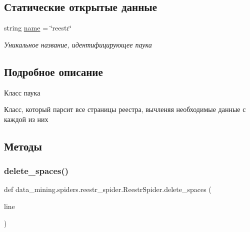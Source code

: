\subsection*{Статические открытые данные}
\begin{DoxyCompactItemize}
\item 
\mbox{\label{classdata__mining_1_1spiders_1_1reestr__spider_1_1ReestrSpider_aac1a411bc811a06b8bb5233c0448562d}} 
string \hyperlink{classdata__mining_1_1spiders_1_1reestr__spider_1_1ReestrSpider_aac1a411bc811a06b8bb5233c0448562d}{name} = \char`\"{}reestr\char`\"{}
\begin{DoxyCompactList}\small\item\em Уникальное название, идентифицирующее паука \end{DoxyCompactList}\end{DoxyCompactItemize}


\subsection{Подробное описание}
Класс паука 

Класс, который парсит все страницы реестра, вычленяя необходимые данные с каждой из них 

\subsection{Методы}
\mbox{\label{classdata__mining_1_1spiders_1_1reestr__spider_1_1ReestrSpider_aa3210a5e3ec964c5a1bbc301f72d101c}} 
\subsubsection{\texorpdfstring{delete\+\_\+spaces()}{delete\_spaces()}}
{\footnotesize\ttfamily def data\+\_\+mining.\+spiders.\+reestr\+\_\+spider.\+Reestr\+Spider.\+delete\+\_\+spaces (\begin{DoxyParamCaption}\item[{}]{line }\end{DoxyParamCaption})\hspace{0.3cm}{\ttfamily [static]}}



